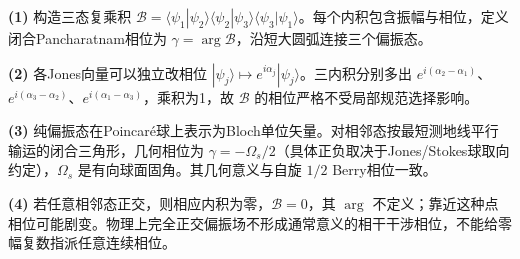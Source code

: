 \par\noindent\textbf{(1)} 构造三态复乘积 \(\mathcal B=\langle\psi_1|\psi_2\rangle\langle\psi_2|\psi_3\rangle\langle\psi_3|\psi_1\rangle\)。每个内积包含振幅与相位，定义闭合Pancharatnam相位为 \(\gamma=\arg\mathcal B\)，沿短大圆弧连接三个偏振态。
\par\noindent\textbf{(2)} 各Jones向量可以独立改相位 \(|\psi_j\rangle\mapsto e^{i\alpha_j}|\psi_j\rangle\)。三内积分别多出 \(e^{i(\alpha_2-\alpha_1)}\)、\(e^{i(\alpha_3-\alpha_2)}\)、\(e^{i(\alpha_1-\alpha_3)}\)，乘积为1，故 \(\mathcal B\) 的相位严格不受局部规范选择影响。
\par\noindent\textbf{(3)} 纯偏振态在Poincaré球上表示为Bloch单位矢量。对相邻态按最短测地线平行输运的闭合三角形，几何相位为 \(\gamma=-\Omega_s/2\)（具体正负取决于Jones/Stokes球取向约定），\(\Omega_s\) 是有向球面固角。其几何意义与自旋 \(1/2\) Berry相位一致。
\par\noindent\textbf{(4)} 若任意相邻态正交，则相应内积为零，\(\mathcal B=0\)，其 \(\arg\) 不定义；靠近这种点相位可能剧变。物理上完全正交偏振场不形成通常意义的相干干涉相位，不能给零幅复数指派任意连续相位。
